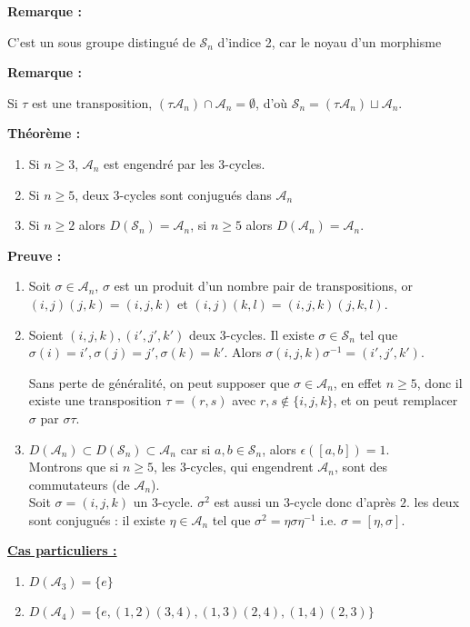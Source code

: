 \documentclass{report}
\newenvironment{preuve}{\begin{tcolorbox}[colframe= white]
    \textbf{Preuve :}
\par }
    {\end{tcolorbox}}
\newenvironment{theoreme}[1][]{
    \begin{tcolorbox}[]
    \textbf{Théorème :} #1  \par} 
    {\end{tcolorbox}}
\newcommand{\remarque}{
    \noindent\textbf{Remarque :} \par
}
\newcommand{\sn}{\mathcal{S}_{n}}
\newcommand{\an}{\mathcal{A}_{n}}
\begin{document}
\remarque{C'est un sous groupe distingué de $\sn$ d'indice 2, car le noyau d'un morphisme}


\remarque{Si $\tau$ est une transposition, $(\tau\an)\cap\an=\emptyset$, d'où $\sn=(\tau\an)\sqcup\an$.}
\begin{theoreme}
\begin{enumerate}
\item Si $n\geq3$, $\an$ est engendré par les 3-cycles.
\item Si $n\geq5$, deux 3-cycles sont conjugués dans $\an$ 
\item Si $n\geq2$ alors $D(\sn)=\an$, si $n\geq5$ alors $D(\an)=\an$.
\end{enumerate}
\end{theoreme}

\begin{preuve}
\begin{enumerate}
\item Soit $\sigma\in\an$, $\sigma$ est un produit d'un nombre pair de transpositions, or $(i,j)(j,k)=(i,j,k)$ et $(i,j)(k,l)=(i,j,k)(j,k,l)$.
\item Soient $(i,j,k),(i',j',k')$ deux 3-cycles. Il existe $\sigma\in\sn$ tel que $\sigma(i)=i', \sigma(j)=j', \sigma(k)=k'$. Alors $\sigma(i,j,k)\sigma^{-1}=(i',j',k')$. \par Sans perte de généralité, on peut supposer que $\sigma\in\an$, en effet $n\geq5$, donc il existe une transposition $\tau=(r,s)$ avec $r,s\notin\{i,j,k\}$, et on peut remplacer $\sigma$ par $\sigma\tau$.
\item $D(\an)\subset D(\sn)\subset\an$ car si $a,b\in\sn$, alors $\epsilon([a,b])=1$.\\
Montrons que si $n\geq5$, les 3-cycles, qui engendrent $\an$, sont des commutateurs (de $\an$).\\
Soit $\sigma=(i,j,k)$ un 3-cycle. $\sigma^2$ est aussi un 3-cycle donc d'après $2.$ les deux sont conjugués : il existe $\eta\in\an$ tel que $\sigma^2=\eta\sigma\eta^{-1}$ i.e. $\sigma=[\eta,\sigma]$.
\end{enumerate}
\end{preuve}

\noindent\underline{\textbf{Cas particuliers :}}
\begin{enumerate}
\item $D(\mathcal{A}_3)=\{e\}$
\item $D(\mathcal{A}_4)=\{e,(1,2)(3,4),(1,3)(2,4),(1,4)(2,3)\}$
\end{enumerate}
\end{document}
